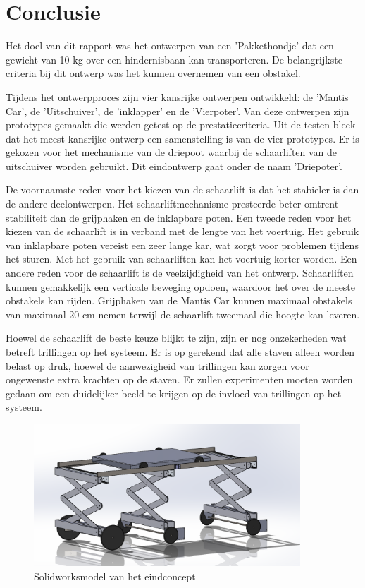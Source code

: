 \chapter{Conclusie}
\label{cha:conclusie}
Het doel van dit rapport was het ontwerpen van een 'Pakkethondje' dat een gewicht van 10 kg over een hindernisbaan kan transporteren. De belangrijkste criteria bij dit ontwerp was het kunnen overnemen van een obstakel. 

Tijdens het ontwerpproces zijn vier kansrijke ontwerpen ontwikkeld: de 'Mantis Car', de 'Uitschuiver', de 'inklapper' en de 'Vierpoter'. Van deze ontwerpen zijn prototypes gemaakt die werden getest op de prestatiecriteria. Uit de testen bleek dat het meest kansrijke ontwerp een samenstelling is van de vier prototypes. Er is gekozen voor het mechanisme van de driepoot waarbij de schaarliften van de uitschuiver worden gebruikt. Dit eindontwerp gaat onder de naam 'Driepoter'.

De voornaamste reden voor het kiezen van de schaarlift is dat het stabieler is dan de andere deelontwerpen. Het schaarliftmechanisme presteerde beter omtrent stabiliteit dan de grijphaken en de inklapbare poten. Een tweede reden voor het kiezen van de schaarlift is in verband met de lengte van het voertuig. Het gebruik van inklapbare poten vereist een zeer lange kar, wat zorgt voor problemen tijdens het sturen. Met het gebruik van schaarliften kan het voertuig korter worden. Een andere reden voor de schaarlift is de veelzijdigheid van het ontwerp. Schaarliften kunnen gemakkelijk een verticale beweging opdoen, waardoor het over de meeste obstakels kan rijden. Grijphaken van de Mantis Car kunnen maximaal obstakels van maximaal 20 cm nemen terwijl de schaarlift tweemaal die hoogte kan leveren.

Hoewel de schaarlift de beste keuze blijkt te zijn, zijn er nog onzekerheden wat betreft trillingen op het systeem. Er is op gerekend dat alle staven alleen worden belast op druk, hoewel de aanwezigheid van trillingen kan zorgen voor ongewenste extra krachten op de staven. Er zullen experimenten moeten worden gedaan om een duidelijker beeld te krijgen op de invloed van trillingen op het systeem. 

\begin{figure}[H]
    \centering
    \includegraphics[width = 100mm]{05_conclusie/eindconcept.jpg}
    \caption{Solidworksmodel van het eindconcept}
    \label{eindconcept}
\end{figure}
